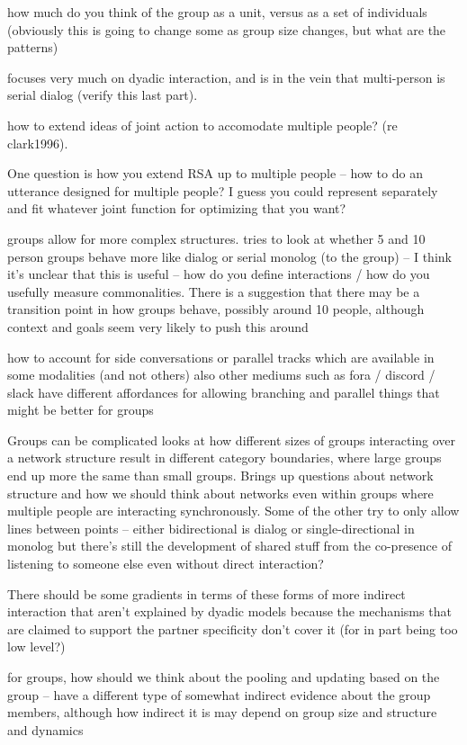 \documentclass[]{article}
\begin{document}
\cite{yoon2019} how much do you think of the group as a unit, versus as a set of individuals (obviously this is going to change some as group size changes, but what are the patterns) 

\cite{clark1996} focuses very much on dyadic interaction, and is in the vein that multi-person is serial dialog (verify this last part). 

how to extend ideas of joint action to accomodate multiple people? (re clark1996). 

One question is how you extend RSA up to multiple people -- how to do an utterance designed for multiple people? I guess you could represent separately and fit whatever joint function for optimizing that you want? 

groups allow for more complex structures. \cite{fay2000} tries to look at whether 5 and 10 person groups behave more like dialog or serial monolog (to the group) -- I think it's unclear that this is useful -- how do you define interactions / how do you usefully measure commonalities. There is a suggestion that there may be a transition point in how groups behave, possibly around 10 people, although context and goals seem very likely to push this around 

how to account for side conversations or parallel tracks which are available in some modalities (and not others) also other mediums such as fora / discord / slack have different affordances for allowing branching and parallel things that might be better for groups 

Groups can be complicated \cite{guilbeault2021} looks at how different sizes of groups interacting over a network structure result in different category boundaries, where large groups end up more the same than small groups. Brings up questions about network structure and how we should think about networks even within groups where multiple people are interacting synchronously. Some of the other try to only allow lines between points -- either bidirectional is dialog or single-directional in monolog but there's still the development of shared stuff from the co-presence of listening to someone else even without direct interaction? 

There should be some gradients in terms of these forms of more indirect interaction that aren't explained by dyadic models because the mechanisms that are claimed to support the partner specificity don't cover it (for in part being too low level?)

\cite{hawkins2021} for groups, how should we think about the pooling and updating based on the group -- have a different type of somewhat indirect evidence about the group members, although how indirect it is may depend on group size and structure and dynamics 
\end{document}
